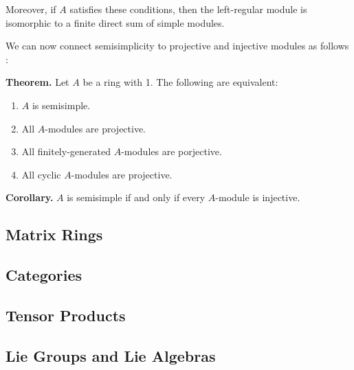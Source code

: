 \documentclass[11pt, reqno]{amsart}
\theoremstyle{plain}
\theoremstyle{definition}
\theoremstyle{example}
\begin{document}
Moreover, if $A$ satisfies these conditions, then the left-regular module is isomorphic to a finite direct sum of simple modules.

\par
We can now connect semisimplicity to projective and injective modules as follows \cite[Lec. 18, p. 4]{dau}:

\par
\textbf{Theorem.} Let $A$ be a ring with 1. The following are equivalent:
\begin{enumerate}
\item $A$ is semisimple.
\item All $A$-modules are projective.
\item All finitely-generated $A$-modules are porjective.
\item All cyclic $A$-modules are projective.
\end{enumerate}

\par
\textbf{Corollary.} $A$ is semisimple if and only if every $A$-module is injective.



\subsection{Matrix Rings}



\subsection{Categories}


\subsection{Tensor Products}


\subsection{Lie Groups and Lie Algebras}

\end{document}
